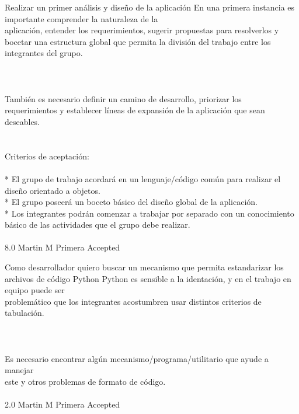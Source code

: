 	{Realizar un primer análisis y diseño de la aplicación} %
	{En una primera instancia es importante comprender la naturaleza de la\\
aplicación, entender los requerimientos, sugerir propuestas para resolverlos y\\
bocetar una estructura global que permita la división del trabajo entre los\\
integrantes del grupo.\\
\\
  \\
\\
También es necesario definir un camino de desarrollo, priorizar los\\
requerimientos y establecer líneas de expansión de la aplicación que sean\\
deseables.\\
\\
  \\
Criterios de aceptación:\\
\\
* El grupo de trabajo acordará en un lenguaje/código común para realizar el diseño orientado a objetos.  \\
* El grupo poseerá un boceto básico del diseño global de la aplicación.  \\
* Los integrantes podrán comenzar a trabajar por separado con un conocimiento básico de las actividades que el grupo debe realizar.  \\
\\
} %
	{} %
	{8.0} %
	{Martin M} %
	{Primera} %
	{Accepted} %


\vspace{20pt}

	{Como desarrollador quiero buscar un mecanismo que permita estandarizar los archivos de código Python} %
	{Python es sensible a la identación, y en el trabajo en equipo puede ser\\
problemático que los integrantes acostumbren usar distintos criterios de\\
tabulación.\\
\\
  \\
\\
Es necesario encontrar algún mecanismo/programa/utilitario que ayude a manejar\\
este y otros problemas de formato de código.\\
\\
} %
	{} %
	{2.0} %
	{Martin M} %
	{Primera} %
	{Accepted} %


